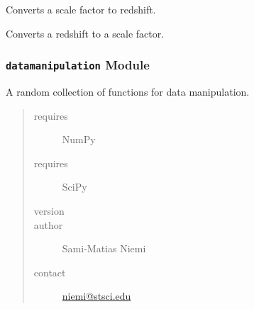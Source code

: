 \documentclass[letterpaper,10pt,english]{sphinxmanual}
\begin{document}

\begin{fulllineitems}
\label{SamPy.astronomy:SamPy.astronomy.conversions.redshiftFromScale}
Converts a scale factor to redshift.

\end{fulllineitems}



\begin{fulllineitems}
\label{SamPy.astronomy:SamPy.astronomy.conversions.scaleFromRedshift}
Converts a redshift to a scale factor.

\end{fulllineitems}



\subsubsection{\texttt{datamanipulation} Module}
\label{SamPy.astronomy:datamanipulation-module}\label{SamPy.astronomy:module-SamPy.astronomy.datamanipulation}
A random collection of functions for data manipulation.
\begin{quote}\begin{description}
\item[{requires}] \leavevmode
NumPy

\item[{requires}] \leavevmode
SciPy

\item[{version}] 

\item[{author}] \leavevmode
Sami-Matias Niemi

\item[{contact}] \leavevmode
\href{mailto:niemi@stsci.edu}{niemi@stsci.edu}

\end{description}\end{quote}

\end{document}
